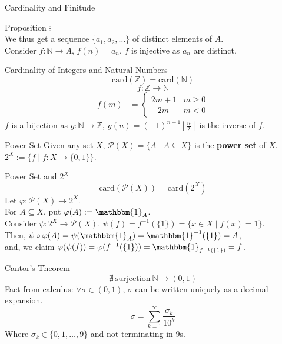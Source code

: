 \documentclass[10pt]{extarticle}
\begin{document}
\begin{problem}{Cardinality and Finitude}
\begin{problem}{Proposition}
      $\vdots$\\

      We thus get a sequence $\{a_1,a_2,\dots\}$ of distinct elements of $A$.\\

      Consider $f:\mathbb{N} \rightarrow A$, $f(n) = a_n$. $f$ is injective as $a_n$ are distinct.
    \end{problem}
    \begin{problem}{Cardinality of Integers and Natural Numbers}
      \[
        \text{card}(\mathbb{Z}) = \text{card}(\mathbb{N})
      \] 
      \tcblower
      \[
        f:\mathbb{Z} \rightarrow \mathbb{N}
      \] 
      \begin{align*}
        f(m) &= \begin{cases}
          2m + 1 & m\geq 0\\
          -2m & m<0
        \end{cases}
      \end{align*}
      $f$ is a bijection as $g:\mathbb{N} \rightarrow \mathbb{Z},~g(n) = (-1)^{n+1}\left\lfloor \frac{n}{2}\right\rfloor$ is the inverse of $f$.
    \end{problem}
    \begin{problem}{Power Set}
      Given any set $X$, $\mathcal{P}(X) = \{A \mid A\subseteq X\}$ is the \textbf{power set} of $X$.\\

      $2^X:= \{f\mid f:X\rightarrow \{0,1\}\}$.
    \end{problem}
    \begin{problem}{Power Set and $2^{X}$}
      \[
        \text{card}(\mathcal{P}(X)) = \text{card}(2^X)
      \] 
      \tcblower
      Let $\varphi: \mathcal{P}(X) \rightarrow 2^X$.\\

      For $A\subseteq X$, put $\varphi(A) := \mathbbm{1}_A$.\\

      Consider $\psi: 2^X \rightarrow \mathcal{P}(X)$. $\psi(f) = f^{-1}(\{1\}) = \{x\in X \mid f(x) = 1\}$.\\

      Then, $\psi\circ\varphi(A) = \psi(\mathbbm{1}_A) = \mathbbm{1}^{-1}(\{1\}) = A$,\\

      and, we claim $\varphi(\psi(f)) = \varphi(f^{-1}(\{1\})) = \mathbbm{1}_{f^{-1}(\{1\})} = f$.
    \end{problem}
    \begin{problem}{Cantor's Theorem}
      \[
        \nexists~\text{surjection}~\mathbb{N}\rightarrow (0,1)
      \] 
      \tcblower
      Fact from calculus: $\forall \sigma\in (0,1)$, $\sigma$ can be written uniquely as a decimal expansion.
      \[
        \sigma = \sum_{k=1}^{\infty} \frac{\sigma_k}{10^k}
      \] 
      Where $\sigma_k\in \{0,1,\dots,9\}$ and not terminating in $9$s.\\


\end{problem}
\end{problem}
\end{document}
